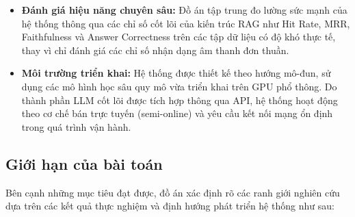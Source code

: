 \begin{itemize}[label={}]
    \item \textbf{Đánh giá hiệu năng chuyên sâu:} Đồ án tập trung đo lường sức mạnh của hệ thống thông qua các chỉ số cốt lõi của kiến trúc RAG như Hit Rate, MRR, Faithfulness và Answer Correctness trên các tập dữ liệu có độ khó thực tế, thay vì chỉ đánh giá các chỉ số nhận dạng âm thanh đơn thuần.
    
    \item \textbf{Môi trường triển khai:} Hệ thống được thiết kế theo hướng mô-đun, sử dụng các mô hình học sâu quy mô vừa triển khai trên GPU phổ thông. Do thành phần LLM cốt lõi được tích hợp thông qua API, hệ thống hoạt động theo cơ chế bán trực tuyến (semi-online) và yêu cầu kết nối mạng ổn định trong quá trình vận hành.
\end{itemize}

\subsection{Giới hạn của bài toán}

Bên cạnh những mục tiêu đạt được, đồ án xác định rõ các ranh giới nghiên cứu dựa trên các kết quả thực nghiệm và định hướng phát triển hệ thống như sau:

